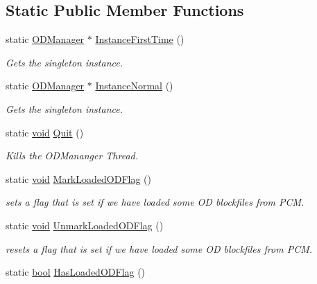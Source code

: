 \subsection*{Static Public Member Functions}
\begin{DoxyCompactItemize}
\item 
static \hyperlink{class_o_d_manager}{O\+D\+Manager} $\ast$ \hyperlink{class_o_d_manager_a52c00180c54d079fa0bda3da113aa2b2}{Instance\+First\+Time} ()
\begin{DoxyCompactList}\small\item\em Gets the singleton instance. \end{DoxyCompactList}\item 
static \hyperlink{class_o_d_manager}{O\+D\+Manager} $\ast$ \hyperlink{class_o_d_manager_a6355bff561d142b4aba170b1df640fc0}{Instance\+Normal} ()
\begin{DoxyCompactList}\small\item\em Gets the singleton instance. \end{DoxyCompactList}\item 
static \hyperlink{sound_8c_ae35f5844602719cf66324f4de2a658b3}{void} \hyperlink{class_o_d_manager_a2f69d81832f89781eee588f411c6e15a}{Quit} ()
\begin{DoxyCompactList}\small\item\em Kills the O\+D\+Mananger Thread. \end{DoxyCompactList}\item 
static \hyperlink{sound_8c_ae35f5844602719cf66324f4de2a658b3}{void} \hyperlink{class_o_d_manager_a7518b9382a822cb20ba70a920da14784}{Mark\+Loaded\+O\+D\+Flag} ()
\begin{DoxyCompactList}\small\item\em sets a flag that is set if we have loaded some OD blockfiles from P\+CM. \end{DoxyCompactList}\item 
static \hyperlink{sound_8c_ae35f5844602719cf66324f4de2a658b3}{void} \hyperlink{class_o_d_manager_ab808eba4b4f987253df06557a5f48846}{Unmark\+Loaded\+O\+D\+Flag} ()
\begin{DoxyCompactList}\small\item\em resets a flag that is set if we have loaded some OD blockfiles from P\+CM. \end{DoxyCompactList}\item 
static \hyperlink{mac_2config_2i386_2lib-src_2libsoxr_2soxr-config_8h_abb452686968e48b67397da5f97445f5b}{bool} \hyperlink{class_o_d_manager_ab316ded3fbf00046c9d57ae2a5a0b891}{Has\+Loaded\+O\+D\+Flag} ()

\end{DoxyCompactItemize}
